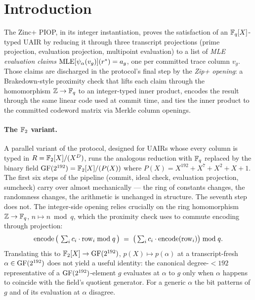\section{Introduction}
\label{sec:intro}

The Zinc+ PIOP, in its integer instantiation, proves the satisfaction
of an $\mathbb{F}_q[X]$-typed UAIR by reducing it through three transcript
projections (prime projection, evaluation projection, multipoint
evaluation) to a list of \emph{MLE evaluation claims}
$\operatorname{MLE}[\psi_{\alpha}(v_g)](r^*) = a_g$, one per committed trace column $v_g$.
Those claims are discharged in the protocol's final step by the
\emph{Zip+ opening}: a Brakedown-style proximity check that lifts each
claim through the homomorphism $\mathbb{Z} \to \mathbb{F}_q$ to an integer-typed
inner product, encodes the result through the same linear code used at
commit time, and ties the inner product to the committed codeword
matrix via Merkle column openings.

\paragraph{The $\mathbb{F}_2$ variant.} A parallel variant of the protocol,
designed for UAIRs whose every column is typed in
$R = \mathbb{F}_2[X]/(X^{D})$, runs the analogous reduction with
$\mathbb{F}_q$ replaced by the binary field $\mathrm{GF}(2^{192}) = \mathbb{F}_2[X]/(P(X))$ where
$P(X) = X^{192} + X^7 + X^2 + X + 1$. The first six steps of the
pipeline (commit, ideal check, evaluation projection, sumcheck) carry
over almost mechanically — the ring of constants changes, the
randomness changes, the arithmetic is unchanged in structure. The
seventh step does not. The integer-side opening relies crucially on
the ring homomorphism $\mathbb{Z} \to \mathbb{F}_q$, $n \mapsto n \bmod q$, which the
proximity check uses to commute encoding through projection:
\[
  \operatorname{encode}\big(\,\textstyle\sum_i c_i \cdot \mathrm{row}_i \bmod q\,\big)
  \;=\;
  \big(\textstyle\sum_i c_i \cdot \operatorname{encode}(\mathrm{row}_i)\big) \bmod q.
\]
Translating this to $\mathbb{F}_2[X] \to \mathrm{GF}(2^{192})$, $p(X) \mapsto p(\alpha)$ at a
transcript-fresh $\alpha \in \mathrm{GF}(2^{192})$ does not yield a useful identity:
the canonical degree-$<192$ representative of a $\mathrm{GF}(2^{192})$-element $g$
evaluates at $\alpha$ to $g$ only when $\alpha$ happens to coincide
with the field's quotient generator. For a generic $\alpha$ the bit
patterns of $g$ and of its evaluation at $\alpha$ disagree.

